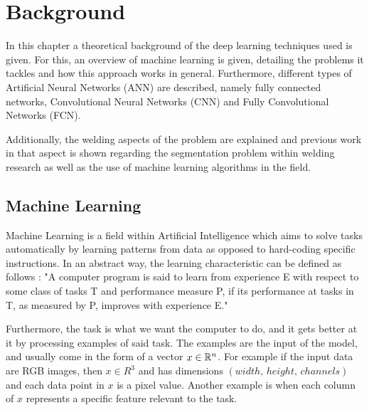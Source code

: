 \chapter{Background}
In this chapter a theoretical background of the deep learning techniques used is given. For this, an overview of machine learning is given, detailing the problems it tackles and how this approach works in general. Furthermore, different types of Artificial Neural Networks (ANN) are described, namely fully connected networks, Convolutional Neural Networks (CNN) and Fully Convolutional Networks (FCN). 

Additionally, the welding aspects of the problem are explained and previous work in that aspect is shown regarding the segmentation problem within welding research as well as the use of machine learning algorithms in the field.

\section{Machine Learning}

Machine Learning is a field within Artificial Intelligence which aims to solve tasks automatically by learning patterns from data as opposed to hard-coding specific instructions. In an abstract way, the learning characteristic can be defined as follows \cite{Mitchell}: "A computer program is said to learn from experience E with respect to some class of tasks T and performance measure P, if its performance at tasks in T, as measured by P, improves with experience E."

Furthermore, the task is what we want the computer to do, and it gets better at it by processing examples of said task. The examples are the input of the model, and usually come in the form of a vector $x \in \mathbb{R}^n$. For example if the input data are RGB images, then $x \in R^3$ and has dimensions $(width,\hspace{2pt} height, \hspace{2pt} channels)$ and each data point in $x$ is a pixel value. Another example is when each column of $x$ represents a specific feature relevant to the task.

